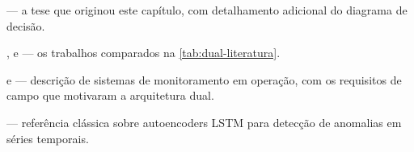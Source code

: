 \begin{leituras}
\item \citet{LopesTese2025} --- a tese que originou este capítulo, com detalhamento
      adicional do diagrama de decisão.
\item \citet{Machado2022}, \citet{Marins2021} e \citet{Turan2021} --- os trabalhos
      comparados na \cref{tab:dual-literatura}.
\item \citet{aranha2023system} e \citet{Aranha2024} --- descrição de sistemas de
      monitoramento em operação, com os requisitos de campo que motivaram a arquitetura
      dual.
\item \citet{Malhotra2015LongST} --- referência clássica sobre autoencoders LSTM para
      detecção de anomalias em séries temporais.
\end{leituras}
